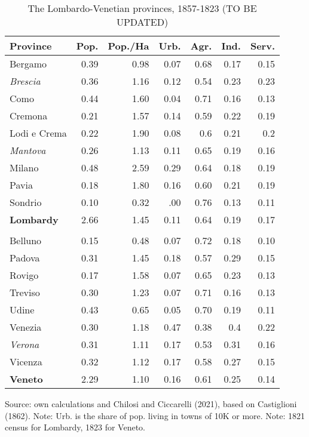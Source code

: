 \documentclass[10pt]{beamer}
\begin{document}
\begin{frame}
\begin{table}[!h]
\caption{The Lombardo-Venetian provinces, 1857-1823 (TO BE UPDATED)}
\centering
\fontsize{8}{8}\selectfont

    \begin{tabular}{l r r r r r r}  
        \toprule
        Province & Pop. & Pop./Ha & Urb. & Agr. & Ind. & Serv.    \\ 
        \midrule
        Bergamo & 0.39 & 0.98 & 0.07 & 0.68 & 0.17 & 0.15 \\
        \textit{Brescia} & 0.36 & 1.16 & 0.12 & 0.54 & 0.23 & 0.23 \\
        Como & 0.44 & 1.60 & 0.04 & 0.71 & 0.16 & 0.13 \\
        Cremona & 0.21 & 1.57 & 0.14 & 0.59 & 0.22 & 0.19 \\
        Lodi e Crema & 0.22 & 1.90 & 0.08 & 0.6 & 0.21 & 0.2 \\
        \textit{Mantova} & 0.26 & 1.13 & 0.11 & 0.65 & 0.19 & 0.16 \\
        Milano & 0.48 & 2.59 & 0.29 & 0.64 & 0.18 & 0.19 \\
        Pavia & 0.18 & 1.80 & 0.16 & 0.60 & 0.21 & 0.19 \\
        Sondrio & 0.10 & 0.32 & .00 & 0.76 & 0.13 & 0.11 \\
        \textbf{Lombardy} & 2.66 & 1.45 & 0.11 & 0.64 & 0.19 & 0.17 \\
         &  & &  &  &  \\
        Belluno & 0.15 & 0.48 & 0.07 & 0.72 & 0.18 & 0.10 \\
        Padova & 0.31 &1.45 & 0.18 & 0.57 & 0.29 & 0.15 \\
        Rovigo & 0.17 & 1.58 & 0.07 & 0.65 & 0.23 & 0.13 \\
        Treviso & 0.30 & 1.23 & 0.07 & 0.71 & 0.16 & 0.13 \\
        Udine & 0.43 & 0.65 & 0.05 & 0.70 & 0.19 & 0.11 \\
        Venezia & 0.30 & 1.18 & 0.47 & 0.38 & 0.4 & 0.22 \\
        \textit{Verona} & 0.31 & 1.11 & 0.17 & 0.53 & 0.31 & 0.16 \\
        Vicenza & 0.32 & 1.12 & 0.17 & 0.58 & 0.27 & 0.15 \\
        \textbf{Veneto} & 2.29 & 1.10 & 0.16 & 0.61 & 0.25 & 0.14 \\
        \bottomrule    
    \end{tabular}
    
    Source: own calculations and Chilosi and Ciccarelli (2021), based on Castiglioni (1862). Note: Urb. is the share of pop. living in towns of 10K or more.
    Note: 1821 census for Lombardy, 1823 for Veneto. 

\end{table}
 
\end{frame}
\end{document}
